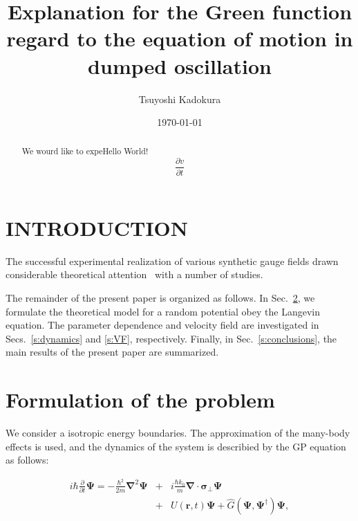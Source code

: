 \documentclass[aps,onecolumn,superscriptaddress,showpacs,pra]{revtex4}
\begin{document}
    \title{Explanation for the Green function regard to the equation of motion in dumped oscillation}

    \author{Tsuyoshi Kadokura}

    \date{\today}
    \begin{abstract}

        We wourd like to expeHello World! \ 
	    \begin{displaymath}
            \frac{\partial v}{\partial t}
        \end{displaymath}
    \end{abstract}


    \maketitle

    \section{INTRODUCTION}
    \label{s:introduction}

    The successful experimental realization of various synthetic gauge fields
    drawn considerable theoretical attention~\cite{A. Messiah}
    with a number of studies.


    The remainder of the present paper is organized as follows. In
    Sec.~\ref{s:formulation}, we formulate the theoretical model
    for a random potential obey the Langevin equation.
    The parameter dependence and velocity field are investigated in
    Secs.~\ref{s:dynamics} and \ref{s:VF}, respectively.
    Finally, in Sec.~\ref{s:conclusions}, the main results of the present
    paper are summarized.

    \section{Formulation of the problem}
    \label{s:formulation}

    We consider a isotropic energy boundaries.
    The approximation of the many-body effects is used, and the dynamics of the system is
    describied by the GP equation as follows:

    \begin{eqnarray}
        \label{eq:GP}
        i \hbar \frac{\partial}{\partial t}\bm \Psi =
        - \frac{\hbar^2}{2m}\bm{\nabla}^2\bm{\Psi}
        &+&i\frac{\hbar k_0}{m} \bm{\nabla} \cdot \bm{\sigma}_\perp \bm\Psi
        \nonumber\\
        &+&U(\bm r,t)\bm\Psi
        + \hat{G}\left( \bm\Psi,\bm \Psi^\dagger\right)\bm\Psi,
    \end{eqnarray}
\end{document}
